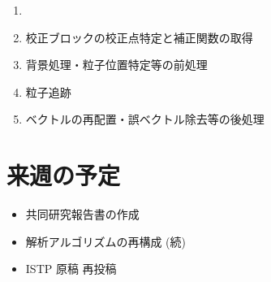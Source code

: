 \documentclass[twocolumn,a4j]{jsarticle}
\begin{document}
\begin{enumerate}[(1)]
  \item [] \textgt{[ 解析プロセス ]}
  \item 校正ブロックの校正点特定と補正関数の取得
  \item 背景処理・粒子位置特定等の前処理
  \item 粒子追跡
  \item ベクトルの再配置・誤ベクトル除去等の後処理
\end{enumerate}


\section{来週の予定}
\begin{itemize}
  \item 共同研究報告書の作成
  \item 解析アルゴリズムの再構成 (続)
  \item ISTP 原稿 再投稿
\end{itemize}
\end{document}
